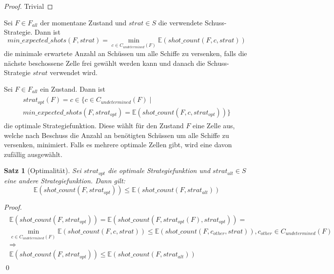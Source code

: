 \documentclass[a4paper,12pt]{llncs}
\numberwithin{equation}{section}
\newtheorem{satz}{Satz}
\begin{document}
\begin{proof}
Trivial
\end{proof}

\begin{definition}
Sei $F\in F_{all}$ der momentane Zustand und $strat \in S$ die verwendete Schuss-Strategie.
Dann ist
\[
min\_expected\_shots(F, strat)=\min_{c \in C_{undetermined}(F)} \mathds{E}(shot\_count(F, c, strat))
\]
die minimale erwartete Anzahl an Schüssen um alle Schiffe zu versenken, falls die nächste beschossene Zelle frei gewählt werden kann und danach die Schuss-Strategie $strat$ verwendet wird.
\end{definition}

\begin{definition}
Sei $F\in F_{all}$ ein Zustand.
Dann ist
\begin{align}
\begin{split}
strat_{opt}(F)=c \in \{c \in C_{undetermined}(F) \mid \\
min\_expected\_shots(F, strat_{opt})= \mathds{E}(shot\_count(F, c, strat_{opt}))\}
\end{split}
\end{align}
die optimale Strategiefunktion.
Diese wählt für den Zustand $F$ eine Zelle aus, welche nach Beschuss die Anzahl an benötigten Schüssen um alle Schiffe zu versenken, minimiert. Falls es mehrere optimale Zellen gibt, wird eine davon zufällig ausgewählt.
\end{definition}

\begin{satz}[Optimalität]
Sei $strat_{opt}$ die optimale Strategiefunktion und $strat_{alt} \in S$ eine andere Strategiefunktion.
Dann gilt:
\[
\mathds{E}(shot\_count(F, strat_{opt})) \leq \mathds{E}(shot\_count(F, strat_{alt}))
\]
\end{satz}

\begin{proof}
\begin{align}
\begin{split}
\mathds{E}(shot\_count(F, strat_{opt})) =\mathds{E}(shot\_count(F, strat_{opt}(F), strat_{opt}))=\\
\min_{c \in C_{undetermined}(F)} \mathds{E}(shot\_count(F, c, strat)) \leq \mathds{E}(shot\_count(F, c_{other}, strat)), c_{other} \in C_{undetermined}(F)\\
\Rightarrow\\
\mathds{E}(shot\_count(F, strat_{opt})) \leq \mathds{E}(shot\_count(F, strat_{alt}))
\end{split}
\end{align}
\qed
\end{proof}
\end{document}
